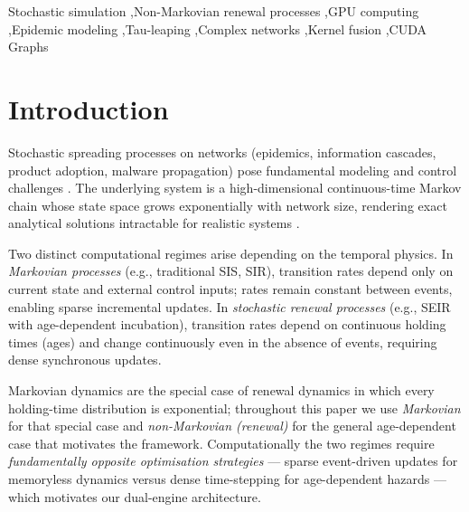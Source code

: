 \documentclass[a4paper,fleqn]{cas-sc}
\theoremstyle{definition}
\theoremstyle{remark}
\begin{document}
\begin{keywords}
Stochastic simulation \sep Non-Markovian renewal processes \sep GPU computing \sep Epidemic modeling \sep Tau-leaping \sep Complex networks \sep Kernel fusion \sep CUDA Graphs
\end{keywords}

\maketitle

\section{Introduction}\label{sec:introduction}

Stochastic spreading processes on networks (epidemics, information cascades, product adoption, malware propagation) pose fundamental modeling and control challenges \citep{pastor2015epidemic, kiss2017mathematics, barrat2008dynamical}. The underlying system is a high-dimensional continuous-time Markov chain whose state space grows exponentially with network size, rendering exact analytical solutions intractable for realistic systems \citep{anderson1991infectious, keeling2008modeling}.

Two distinct computational regimes arise depending on the temporal physics. In \emph{Markovian processes} (e.g., traditional SIS, SIR), transition rates depend only on current state and external control inputs; rates remain constant between events, enabling sparse incremental updates. In \emph{stochastic renewal processes} (e.g., SEIR with age-dependent incubation), transition rates depend on continuous holding times (ages) and change continuously even in the absence of events, requiring dense synchronous updates.

Markovian dynamics are the special case of renewal dynamics in which every holding-time distribution is exponential; throughout this paper we use \emph{Markovian} for that special case and \emph{non-Markovian (renewal)} for the general age-dependent case that motivates the framework. Computationally the two regimes require \emph{fundamentally opposite optimisation strategies} --- sparse event-driven updates for memoryless dynamics versus dense time-stepping for age-dependent hazards --- which motivates our dual-engine architecture.
\end{document}
